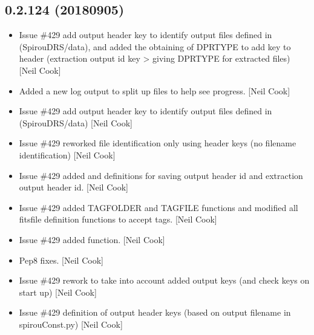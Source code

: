 \documentclass[a4paper,10pt,english]{report}
\begin{document}
\subsection{0.2.124 (2018\sphinxhyphen{}09\sphinxhyphen{}05)}
\label{\detokenize{misc/changelog:id354}}\begin{itemize}
\item {} 
Issue \#429 \sphinxhyphen{} add output header key to identify output files
 \sphinxhyphen{} defined in  (SpirouDRS/data), and added
the obtaining of DPRTYPE to add   key to header (extraction
output id key \textendash{}\textgreater{} giving DPRTYPE for extracted files) {[}Neil Cook{]}

\item {} 
Added a new log output to split up files to help see progress. {[}Neil
Cook{]}

\item {} 
Issue \#429 \sphinxhyphen{} add output header key to identify output files
 \sphinxhyphen{} defined in  (SpirouDRS/data) {[}Neil Cook{]}

\item {} 
Issue \#429 \sphinxhyphen{} re\sphinxhyphen{}worked file identification only using header keys (no
filename identification) {[}Neil Cook{]}

\item {} 
Issue \#429 \sphinxhyphen{} added  and  definitions for saving
output header id and extraction output header id. {[}Neil Cook{]}

\item {} 
Issue \#429 \sphinxhyphen{} added TAGFOLDER and TAGFILE functions and modified all
fits\sphinxhyphen{}file definition functions to accept tags. {[}Neil Cook{]}

\item {} 
Issue \#429 \sphinxhyphen{} added  function. {[}Neil Cook{]}

\item {} 
Pep8 fixes. {[}Neil Cook{]}

\item {} 
Issue \#429 \sphinxhyphen{} re\sphinxhyphen{}work  to take into account added
output keys (and check keys on start up) {[}Neil Cook{]}

\item {} 
Issue \#429 \sphinxhyphen{} definition of output header keys (based on output
filename in spirouConst.py) {[}Neil Cook{]}


\end{itemize}
\end{document}
